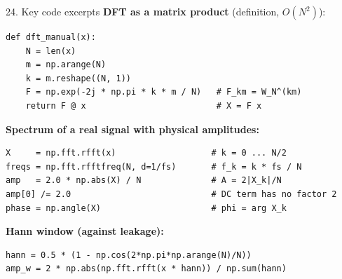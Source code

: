 \documentclass[aspectratio=169,10pt]{beamer}
\begin{document}
\begin{frame}[fragile]{24. Key code excerpts}
  \footnotesize
  \textbf{DFT as a matrix product} (definition, $O(N^2)$):
\begin{verbatim}
def dft_manual(x):
    N = len(x)
    m = np.arange(N)
    k = m.reshape((N, 1))
    F = np.exp(-2j * np.pi * k * m / N)   # F_km = W_N^(km)
    return F @ x                          # X = F x
\end{verbatim}
  \textbf{Spectrum of a real signal with physical amplitudes:}
\begin{verbatim}
X     = np.fft.rfft(x)                   # k = 0 ... N/2
freqs = np.fft.rfftfreq(N, d=1/fs)       # f_k = k * fs / N
amp   = 2.0 * np.abs(X) / N              # A = 2|X_k|/N
amp[0] /= 2.0                            # DC term has no factor 2
phase = np.angle(X)                      # phi = arg X_k
\end{verbatim}
  \textbf{Hann window (against leakage):}
\begin{verbatim}
hann = 0.5 * (1 - np.cos(2*np.pi*np.arange(N)/N))
amp_w = 2 * np.abs(np.fft.rfft(x * hann)) / np.sum(hann)
\end{verbatim}
\end{frame}
\end{document}
